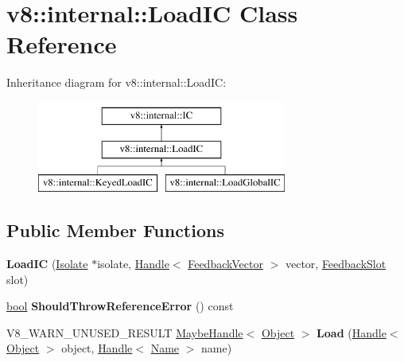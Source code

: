 \hypertarget{classv8_1_1internal_1_1LoadIC}{}\section{v8\+:\+:internal\+:\+:Load\+IC Class Reference}
\label{classv8_1_1internal_1_1LoadIC}
Inheritance diagram for v8\+:\+:internal\+:\+:Load\+IC\+:\begin{figure}[H]
\begin{center}
\leavevmode
\includegraphics[height=3.000000cm]{classv8_1_1internal_1_1LoadIC}
\end{center}
\end{figure}
\subsection*{Public Member Functions}
\begin{DoxyCompactItemize}
\item 
\mbox{\label{classv8_1_1internal_1_1LoadIC_a43fd3c76f7b1528e506403d2ca86fb12}} 
{\bfseries Load\+IC} (\mbox{\hyperlink{classv8_1_1internal_1_1Isolate}{Isolate}} $\ast$isolate, \mbox{\hyperlink{classv8_1_1internal_1_1Handle}{Handle}}$<$ \mbox{\hyperlink{classv8_1_1internal_1_1FeedbackVector}{Feedback\+Vector}} $>$ vector, \mbox{\hyperlink{classv8_1_1internal_1_1FeedbackSlot}{Feedback\+Slot}} slot)
\item 
\mbox{\label{classv8_1_1internal_1_1LoadIC_a6d475217f07a2d6901a77e904634aa2c}} 
\mbox{\hyperlink{classbool}{bool}} {\bfseries Should\+Throw\+Reference\+Error} () const
\item 
\mbox{\label{classv8_1_1internal_1_1LoadIC_a6f5824f411ac14f831a09a11e20c85b3}} 
V8\+\_\+\+W\+A\+R\+N\+\_\+\+U\+N\+U\+S\+E\+D\+\_\+\+R\+E\+S\+U\+LT \mbox{\hyperlink{classv8_1_1internal_1_1MaybeHandle}{Maybe\+Handle}}$<$ \mbox{\hyperlink{classv8_1_1internal_1_1Object}{Object}} $>$ {\bfseries Load} (\mbox{\hyperlink{classv8_1_1internal_1_1Handle}{Handle}}$<$ \mbox{\hyperlink{classv8_1_1internal_1_1Object}{Object}} $>$ object, \mbox{\hyperlink{classv8_1_1internal_1_1Handle}{Handle}}$<$ \mbox{\hyperlink{classv8_1_1internal_1_1Name}{Name}} $>$ name)
\end{DoxyCompactItemize}
